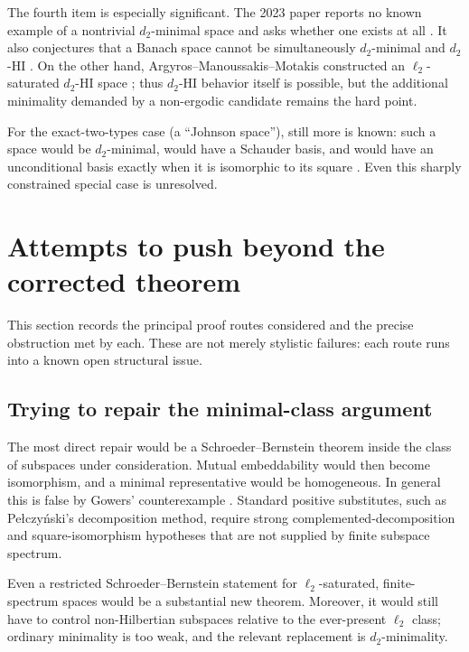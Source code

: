 \documentclass[11pt]{article}
\theoremstyle{definition}
\theoremstyle{remark}
\newcommand{\ellTwo}{\ell_2}
\begin{document}
The fourth item is especially significant.  The 2023 paper reports no known example of a nontrivial \(d_2\)-minimal space and asks whether one exists at all \cite[Question 6.8]{CCRF2023}.  It also conjectures that a Banach space cannot be simultaneously \(d_2\)-minimal and \(d_2\)-HI \cite[Conjecture 6.26]{CCRF2023}.  On the other hand, Argyros--Manoussakis--Motakis constructed an \(\ellTwo\)-saturated \(d_2\)-HI space \cite{AMM2025}; thus \(d_2\)-HI behavior itself is possible, but the additional minimality demanded by a non-ergodic candidate remains the hard point.

For the exact-two-types case (a ``Johnson space''), still more is known: such a space would be \(d_2\)-minimal, would have a Schauder basis, and would have an unconditional basis exactly when it is isomorphic to its square \cite[Proposition 6.7 and Corollary 6.16]{CCRF2023}.  Even this sharply constrained special case is unresolved.

\section{Attempts to push beyond the corrected theorem}

This section records the principal proof routes considered and the precise obstruction met by each.  These are not merely stylistic failures: each route runs into a known open structural issue.

\subsection{Trying to repair the minimal-class argument}

The most direct repair would be a Schroeder--Bernstein theorem inside the class of subspaces under consideration.  Mutual embeddability would then become isomorphism, and a minimal representative would be homogeneous.  In general this is false by Gowers' counterexample \cite{GowersSB}.  Standard positive substitutes, such as Pe\l czy\'nski's decomposition method, require strong complemented-decomposition and square-isomorphism hypotheses that are not supplied by finite subspace spectrum.

Even a restricted Schroeder--Bernstein statement for \(\ellTwo\)-saturated, finite-spectrum spaces would be a substantial new theorem.  Moreover, it would still have to control non-Hilbertian subspaces relative to the ever-present \(\ellTwo\) class; ordinary minimality is too weak, and the relevant replacement is \(d_2\)-minimality.
\end{document}
